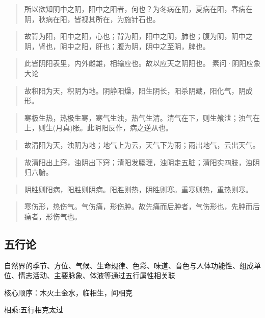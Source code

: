 \documentclass[
  letterpaper,
  DIV=11,
  numbers=noendperiod]{scrreprt}
\begin{document}
\begin{quote}
所以欲知阴中之阴，阳中之阳者，何也？为冬病在阴，夏病在阳，春病在阴，秋病在阳，皆视其所在，为施针石也。
\end{quote}

\begin{quote}
故背为阳，阳中之阳，心也；背为阳，阳中之阴，肺也；腹为阴，阴中之阴，肾也，阴中之阳，肝也；腹为阴，阴中之至阴，脾也。
\end{quote}

\begin{quote}
此皆阴阳表里，内外雌雄，相输应也。故以应天之阴阳也。 素问·阴阳应象大论
\end{quote}

\begin{quote}
故积阳为天，积阴为地。阴静阳燥，阳生阴长，阳杀阴藏，阳化气，阴成形。
\end{quote}

\begin{quote}
寒极生热，热极生寒，寒气生浊，热气生清。清气在下，则生飧泄；浊气在上，则生(月真)胀。此阴阳反作，病之逆从也。
\end{quote}

\begin{quote}
故清阳为天，浊阴为地；地气上为云，天气下为雨；雨出地气，云出天气。
\end{quote}

\begin{quote}
故清阳出上窍，浊阴出下窍；清阳发腠理，浊阴走五脏；清阳实四肢，浊阴归六腑。
\end{quote}

\begin{quote}
阴胜则阳病，阳胜则阴病。阳胜则热，阴胜则寒。重寒则热，重热则寒。
\end{quote}

\begin{quote}
寒伤形，热伤气。气伤痛，形伤肿。故先痛而后肿者，气伤形也，先肿而后痛者，形伤气也。
\end{quote}

\subsection{五行论}\label{ux4e94ux884cux8bba}

自然界的季节、方位、气候、生命规律、色彩、味道、音色与人体功能性、组成单位、情志活动、主要脉象、体液等通过五行属性相关联

核心顺序：木火土金水，临相生，间相克

相乘:五行相克太过
\end{document}

